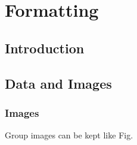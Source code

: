 \section{Formatting} \label{section:fmt}

\vspace{1.5cm}
\subsection{Introduction} 
\label{subsec:fmt_intro}
\lipsum[3]

\subsection{Data and Images} 
\label{subsubsec:Data and Images}

\subsubsection{Images}
Group images can be kept like Fig. \\

